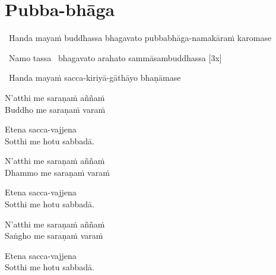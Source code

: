 
\section{Pubba-bhāga}
\label{pubba-bhaga}

\begin{intro}
	\anglebracketleft\ \hspace{-0.5mm}Handa mayaṁ buddhassa bhagavato pubbabhāga-namakāraṁ karomase \hspace{-0.5mm}\anglebracketright\
\end{intro}

\anglebracketleft\ \hspace{-0.5mm}Namo tassa \hspace{-0.5mm}\anglebracketright\ bhagavato arahato sammāsambuddhassa \hfill{[3x]}


\begin{center}
	\anglebracketleft\ \hspace{-0.5mm}Handa mayaṁ sacca-kiriyā-gāthāyo bhaṇāmase \hspace{-0.5mm}\anglebracketright\
\end{center}


\begin{pali-hang}
N'atthi me saraṇaṁ aññaṁ\\
Buddho me saraṇaṁ varaṁ
\end{pali-hang}
\begin{pali-hang}
Etena sacca-vajjena\\
Sotthi me hotu sabbadā.
\end{pali-hang}

\begin{pali-hang}
N'atthi me saraṇaṁ aññaṁ\\
Dhammo me saraṇaṁ varaṁ
\end{pali-hang}
\begin{pali-hang}
Etena sacca-vajjena\\
Sotthi me hotu sabbadā.
\end{pali-hang}

\begin{pali-hang}
N'atthi me saraṇaṁ aññaṁ\\
Saṅgho me saraṇaṁ varaṁ
\end{pali-hang}
\begin{pali-hang}
Etena sacca-vajjena\\
Sotthi me hotu sabbadā.
\end{pali-hang}

\clearpage

